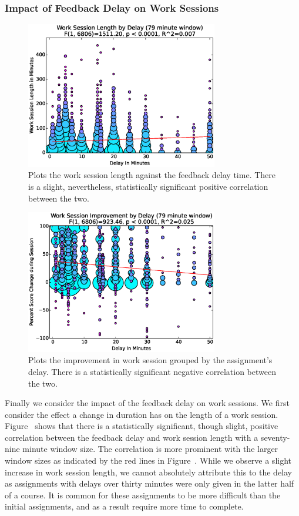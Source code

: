 \subsubsection{Impact of Feedback Delay on Work Sessions}

\begin{figure}[!t]
\centering \includegraphics[width=3.3in]{graphs/Work_Session_Length_by_Delay_(79_minute_window).eps}
\caption{Plots the work session length against the feedback delay time. There
  is a slight, nevertheless, statistically significant positive correlation
  between the two.}
\end{figure}

\begin{figure}[!t]
\centering \includegraphics[width=3.3in]{graphs/Work_Session_Improvement_by_Delay_(79_minute_window).eps}
\caption{Plots the improvement in work session grouped by the assignment's
  delay. There is a statistically significant negative correlation between the
  two.}
\end{figure}

Finally we consider the impact of the feedback delay on work sessions. We first
consider the effect a change in duration has on the length of a work
session. Figure~ shows that there is a
statistically significant, though slight, positive correlation between the
feedback delay and work session length with a seventy-nine minute window
size. The correlation is more prominent with the larger window sizes as
indicated by the red lines in Figure~. While we
observe a slight increase in work session length, we cannot absolutely
attribute this to the delay as assignments with delays over thirty minutes were
only given in the latter half of a course. It is common for these assignments
to be more difficult than the initial assignments, and as a result require more
time to complete.

